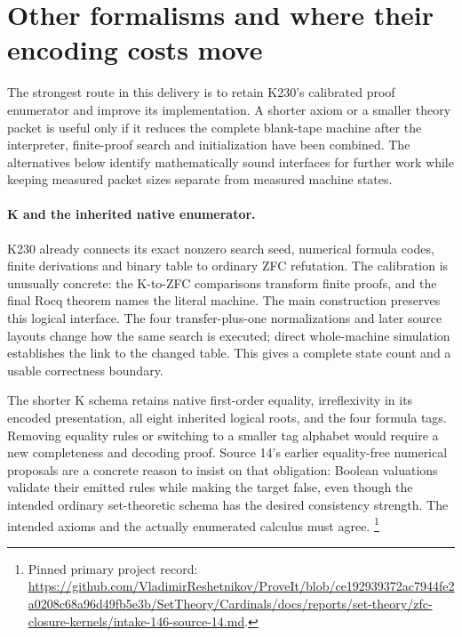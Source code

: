 \section{Other formalisms and where their encoding costs move}
\label{sec:formalism-encoding-comparison}

The strongest route in this delivery is to retain K230's calibrated
proof enumerator and improve its implementation.  A shorter axiom or a
smaller theory packet is useful only if it reduces the complete blank-tape
machine after the interpreter, finite-proof search and initialization
have been combined.  The alternatives below identify mathematically
sound interfaces for further work while keeping measured packet sizes
separate from measured machine states.

\paragraph{K and the inherited native enumerator.}
K230 already connects its exact nonzero search seed, numerical formula
codes, finite derivations and binary table to ordinary ZFC refutation.
The calibration is unusually concrete: the K-to-ZFC comparisons transform
finite proofs, and the final Rocq theorem names the literal machine.
The main construction preserves this logical interface.  The four
transfer-plus-one normalizations and later source layouts change how
the same search is executed; direct whole-machine simulation establishes
the link to the changed table.  This gives a complete state count and
a usable correctness boundary.\cite{k230}

The shorter K schema retains native first-order equality, irreflexivity
in its encoded presentation, all eight inherited logical roots, and the
four formula tags.  Removing equality rules or switching to a smaller
tag alphabet would require a new completeness and decoding proof.
Source 14's earlier equality-free numerical proposals are a concrete
reason to insist on that obligation: Boolean valuations validate their
emitted rules while making the target false, even though the intended
ordinary set-theoretic schema has the desired consistency strength.
The intended axioms and the actually enumerated calculus must agree.
\footnote{Pinned primary project record:
\url{https://github.com/VladimirReshetnikov/ProveIt/blob/ce192939372ac7944fe2a0208c68a96d49fb5e3b/SetTheory/Cardinals/docs/reports/set-theory/zfc-closure-kernels/intake-146-source-14.md}.}

